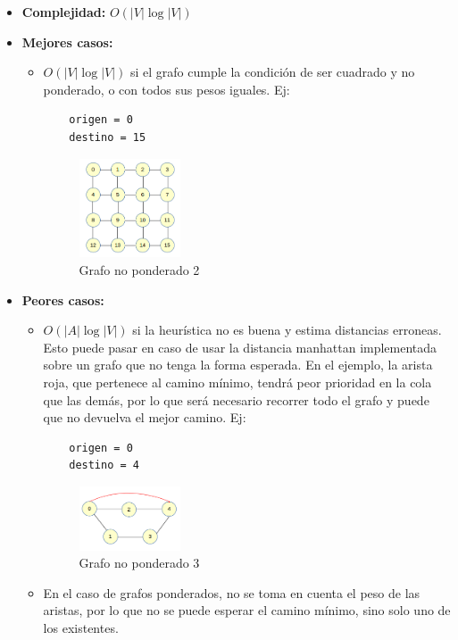 \documentclass[a4paper,10pt]{article}
\begin{document}
\begin{itemize}
\item \textbf{Complejidad:} $O(|V| \log{|V|})$
\item \textbf{Mejores casos:}
	\begin{itemize}
	\item $O(|V| \log{|V|})$ si el grafo cumple la condición de ser cuadrado y no ponderado, o con todos sus pesos iguales. Ej:
	\begin{verbatim}
	origen = 0
	destino = 15
	\end{verbatim}
	\begin{figure}[H]
	\begin{center}
	\includegraphics[width=0.3\textwidth]{./g7.png}
	\caption{Grafo no ponderado 2}
	\label{fig:g7}
	\end{center}
	\end{figure}
	\end{itemize}
\item \textbf{Peores casos:}
	\begin{itemize}
	\item $O(|A| \log{|V|})$ si la heurística no es buena y estima distancias erroneas. Esto puede pasar en caso de usar la distancia manhattan implementada sobre un grafo que no tenga la forma esperada. En el ejemplo, la arista roja, que pertenece al camino mínimo, tendrá peor prioridad en la cola que las demás, por lo que será necesario recorrer todo el grafo y puede que no devuelva el mejor camino. Ej:
	\begin{verbatim}
	origen = 0
	destino = 4
	\end{verbatim}
	\begin{figure}[H]
	\begin{center}
	\includegraphics[width=0.3\textwidth]{./g8.png}
	\caption{Grafo no ponderado 3}
	\label{fig:g8}
	\end{center}
	\end{figure}
	\item En el caso de grafos ponderados, no se toma en cuenta el peso de las aristas, por lo que no se puede esperar el camino mínimo, sino solo uno de los existentes.
	\end{itemize}
\end{itemize}
\end{document}
